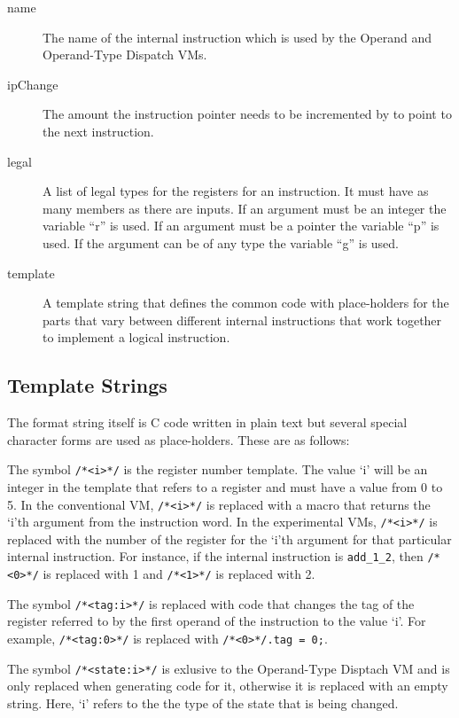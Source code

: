 \documentclass[english,a4paper,12pt]{report}
\begin{document}
\begin{description}
\item[name] The name of the internal instruction which is used by the
  Operand and Operand-Type Dispatch VMs.
\item[ipChange] The amount the instruction pointer needs to be
  incremented by to point to the next instruction.
\item[legal] A list of legal types for the registers for an
  instruction. It must have as many members as there are inputs. If an
  argument must be an integer the variable ``r'' is used. If an
  argument must be a pointer the variable ``p'' is used. If the
  argument can be of any type the variable ``g'' is used.
\item[template] A template string that defines the common code with
  place-holders for the parts that vary between different internal
  instructions that work together to implement a logical instruction.
\end{description}

\subsection{Template Strings}

The format string itself is C code written in plain text but several
special character forms are used as place-holders. These are as
follows:

The symbol \verb|/*<i>*/| is the register number template. The value
`i' will be an integer in the template that refers to a register and
must have a value from 0 to 5. In the conventional VM, \verb|/*<i>*/|
is replaced with a macro that returns the `i'th argument from the
instruction word. In the experimental VMs, \verb|/*<i>*/| is replaced
with the number of the register for the `i'th argument for that
particular internal instruction.  For instance, if the internal
instruction is \verb|add_1_2|, then \verb|/*<0>*/| is replaced with 1
and \verb|/*<1>*/| is replaced with 2.

The symbol \verb|/*<tag:i>*/| is replaced with code that changes the
tag of the register referred to by the first operand of the
instruction to the value `i'. For example, \verb|/*<tag:0>*/| is
replaced with \verb|/*<0>*/.tag = 0;|.

The symbol \verb|/*<state:i>*/| is exlusive to the Operand-Type
Disptach VM and is only replaced when generating code for it,
otherwise it is replaced with an empty string. Here, `i' refers to
the the type of the state that is being changed.
\end{document}
